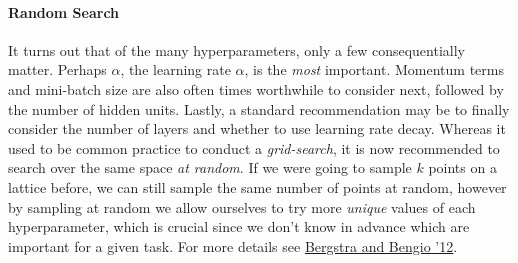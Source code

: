 \documentclass[12pt]{article}
\begin{document}
\paragraph{Random Search}
It turns out that of the many hyperparameters, only a few consequentially matter. Perhaps $\alpha$, 
the learning rate $\alpha$, is the 
\emph{most} important. Momentum terms and mini-batch size are also often times worthwhile to consider next, 
followed by the number of 
hidden units. Lastly, a standard recommendation may be to finally 
consider the number of layers and whether to use learning rate decay. 
Whereas it used to 
be common practice to conduct a \emph{grid-search}, it is now recommended to 
search over the same space
\emph{at random}. If we were going to sample $k$ points on a lattice before, we can still sample the same 
number of points at 
random, however by sampling at random we allow ourselves to try more \emph{unique} values of 
each hyperparameter, which is 
crucial since we don't know in advance which are important for a given task. For more details see
\href{http://www.jmlr.org/papers/volume13/bergstra12a/bergstra12a.pdf}{Bergstra and Bengio '12}.

\begin{minipage}{1.0\textwidth} 
  \begin{multicols}{2} 
\vfill\null \columnbreak
{}
\end{multicols} 
\end{minipage}
\end{document}
